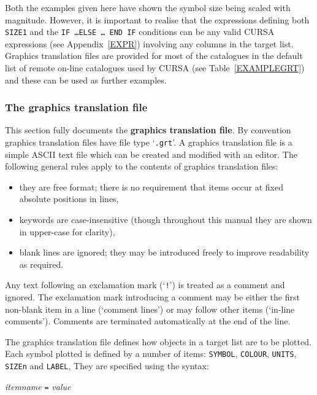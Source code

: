 \documentclass[twoside,11pt]{article}
\renewcommand{\_}{\texttt{\symbol{95}}}
\begin{document}
Both the examples given here have shown the symbol size being scaled
with magnitude.  However, it is important to realise that the
expressions defining both {\tt SIZE1} and the {\tt IF \ldots ELSE \ldots 
END IF} conditions can be any valid CURSA expressions (see
Appendix~\ref{EXPR}) involving any columns in the target list.  Graphics
translation files are provided for most of the catalogues in the default
list of remote on-line catalogues used by CURSA (see Table~\ref{EXAMPLEGRT})
and these can be used as further examples.

\subsubsection{The graphics translation file}

This section fully documents the {\bf graphics translation file}.
By convention graphics translation files have file type `{\tt .grt}'.
A graphics translation file is a simple ASCII text file which
can be created and modified with an editor.  The following general
rules apply to the contents of graphics translation files:

\begin{itemize}

  \item they are free format; there is no requirement that items occur
   at fixed absolute positions in lines,

  \item keywords are case-insensitive (though throughout this manual they
   are shown in upper-case for clarity),

  \item blank lines are ignored; they may be introduced freely to
   improve readability as required.

\end{itemize}

Any text following an exclamation mark (`{\tt !}') is treated as a
comment and ignored.  The exclamation mark introducing a comment may
be either the first non-blank item in a line (`comment lines') or
may follow other items (`in-line comments').  Comments are terminated
automatically at the end of the line.

The graphics translation file defines how objects in a target list are
to be plotted.  Each symbol plotted is defined by a number of items:
{\tt SYMBOL}, {\tt COLOUR}, {\tt UNITS}, {\tt SIZEn} and {\tt LABEL},
They are specified using the syntax:

\begin{center}
{\it item\_name} {\tt =} {\it value}
\end{center}
\end{document}
